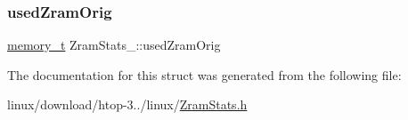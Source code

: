\mbox{\label{structZramStats___a1633db7f4c209c64af90320fbdd6da3e}} 
\subsubsection{\texorpdfstring{used\+Zram\+Orig}{usedZramOrig}}
{\footnotesize\ttfamily \hyperlink{Machine_8h_ac8c2c5995f64727051f4034a810e5b07}{memory\+\_\+t} Zram\+Stats\+\_\+\+::used\+Zram\+Orig}



The documentation for this struct was generated from the following file\+:\begin{DoxyCompactItemize}
\item 
linux/download/htop-\/3../linux/\hyperlink{ZramStats_8h}{Zram\+Stats.\+h}\end{DoxyCompactItemize}
